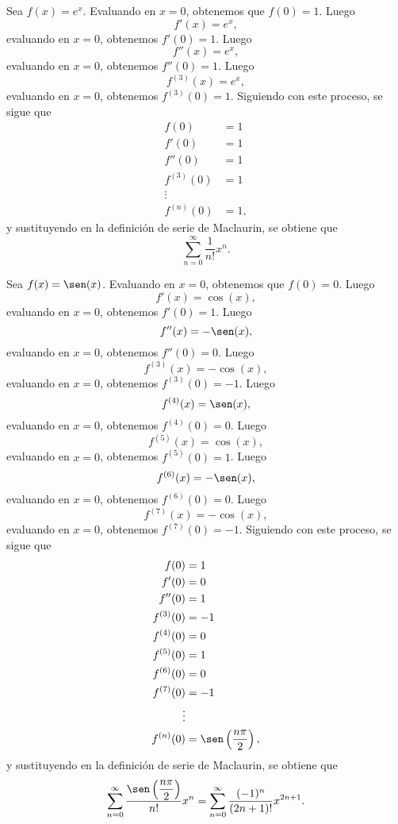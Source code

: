 \begin{myexample}
    Sea $f(x) = e^x$. Evaluando en $x = 0$, obtenemos que $f(0) = 1$. Luego
    $$f'(x) = e^x,$$
    evaluando en $x = 0$, obtenemos $f'(0) = 1$. Luego
    $$f''(x) = e^x,$$
    evaluando en $x = 0$, obtenemos $f''(0) = 1$. Luego
    $$f^{(3)}(x) = e^x,$$
    evaluando en $x = 0$, obtenemos $f^{(3)}(0) = 1$. Siguiendo con este proceso, se sigue que
    \begin{align*}
        f(0) & = 1 \\
        f'(0) & = 1 \\
        f''(0) & = 1 \\
        f^{(3)}(0) & = 1 \\
        \vdots & \\
        f^{(n)}(0) & = 1,
    \end{align*}
    y sustituyendo en la definición de serie de Maclaurin, se obtiene que
    $$\sum_{n=0}^{\infty} \frac{1}{n!} x^n.$$
\end{myexample}

\begin{myexample}
    Sea $f(x) = \sen(x)$. Evaluando en $x = 0$, obtenemos que $f(0) = 0$. Luego
    $$f'(x) = \cos(x),$$
    evaluando en $x = 0$, obtenemos $f'(0) = 1$. Luego
    $$f''(x) = -\sen(x),$$
    evaluando en $x = 0$, obtenemos $f''(0) = 0$. Luego
    $$f^{(3)}(x) = -\cos(x),$$
    evaluando en $x = 0$, obtenemos $f^{(3)}(0) = -1$. Luego
    $$f^{(4)}(x) = \sen(x),$$
    evaluando en $x = 0$, obtenemos $f^{(4)}(0) = 0$. Luego
    $$f^{(5)}(x) = \cos(x),$$
    evaluando en $x = 0$, obtenemos $f^{(5)}(0) = 1$. Luego
    $$f^{(6)}(x) = -\sen(x),$$
    evaluando en $x = 0$, obtenemos $f^{(6)}(0) = 0$. Luego
    $$f^{(7)}(x) = -\cos(x),$$
    evaluando en $x = 0$, obtenemos $f^{(7)}(0) = -1$. Siguiendo con este proceso, se sigue que
    \begin{align*}
        f(0) & = 1 \\
        f'(0) & = 0 \\
        f''(0) & = 1 \\
        f^{(3)}(0) & = -1 \\
        f^{(4)}(0) & = 0 \\
        f^{(5)}(0) & = 1 \\
        f^{(6)}(0) & = 0 \\
        f^{(7)}(0) & = -1 \\
        \vdots & \\
        f^{(n)}(0) & = \sen\left(\frac{n\pi}{2}\right),
    \end{align*}
    y sustituyendo en la definición de serie de Maclaurin, se obtiene que
    $$\sum_{n=0}^{\infty} \frac{\displaystyle \sen\left(\frac{n\pi}{2}\right)}{n!} x^n = \sum_{n=0}^{\infty} \frac{(-1)^n}{(2n+1)!}x^{2n+1}.$$
\end{myexample}

